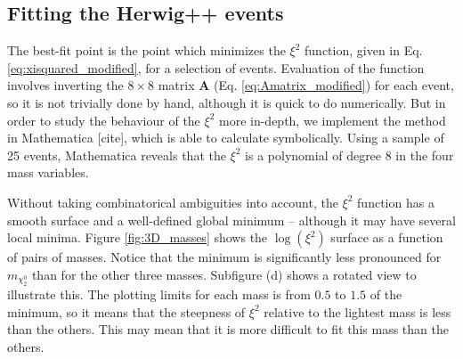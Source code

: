 \documentclass[twoside,english]{uiofysmaster}
\begin{document}

\subsection{Fitting the {\ttfamily Herwig++} events}
The best-fit point is the point which minimizes the $\xi^2$ function, given in Eq. \eqref{eq:xisquared_modified}, for a selection of events. Evaluation of the function involves inverting the $8\times 8$ matrix $\mathbf{A}$ (Eq. \eqref{eq:Amatrix_modified}) for each event, so it is not trivially done by hand, although it is quick to do numerically. But in order to study the behaviour of the $\xi^2$ more in-depth, we implement the method in Mathematica [cite], which is able to calculate symbolically. Using a sample of 25 events, Mathematica reveals that the $\xi^2$ is a polynomial of degree 8 in the four mass variables. 

Without taking combinatorical ambiguities into account, the $\xi^2$ function has a smooth surface and a well-defined global minimum -- although it may have several local minima. Figure \ref{fig:3D_masses} shows the $\log(\xi^2)$ surface as a function of pairs of masses. Notice that the minimum is significantly less pronounced for $m_{\chi_2^0}$ than for the other three masses. Subfigure (d) shows a rotated view to illustrate this. The plotting limits for each mass is from $0.5$ to $1.5$ of the minimum, so it means that the steepness of $\xi^2$ relative to the lightest mass is less than the others. This may mean that it is more difficult to fit this mass than the others.
\end{document}
